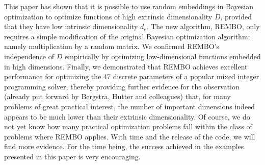 \documentclass{article}
\begin{document}
This paper has shown that it is possible to use random embeddings in Bayesian optimization to optimize functions 
of high extrinsic dimensionality $D$, provided that they have low intrinsic dimensionality $d_e$. 
The new algorithm, REMBO, only requires a simple modification of the original Bayesian optimization algorithm; namely multiplication by a random matrix. 
We confirmed REMBO's independence of $D$ empirically by optimizing low-dimensional functions embedded in high dimensions. 
Finally, we demonstrated that REMBO achieves excellent performance for optimizing the 47 discrete parameters of a popular mixed integer programming solver,
thereby providing further evidence for the observation (already put forward by Bergstra, Hutter and colleagues) that, for many problems of great practical interest, the number of 
important dimensions indeed appears to be much lower than their extrinsic dimensionality. Of course, we do not yet know how many practical optimization problems fall within the class of problems where REMBO applies. With time and the release of the code, we will find more evidence. For the time being, the success achieved in the examples presented in this paper 
is very encouraging.









\small


\end{document}
